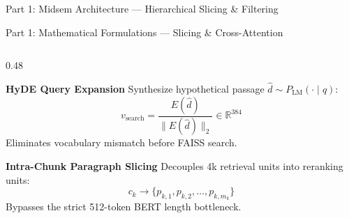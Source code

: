\documentclass[10pt,aspectratio=169]{beamer}
\begin{document}
\begin{frame}{Part 1: Midsem Architecture --- Hierarchical Slicing \& Filtering}
\end{frame}

\begin{frame}{Part 1: Mathematical Formulations --- Slicing \& Cross-Attention}
    \begin{columns}[onlytextwidth,T]
        \begin{column}{0.48\textwidth}
            \begin{block}{\textbf{HyDE Query Expansion}}
                \footnotesize
                Synthesize hypothetical passage $\hat{d} \sim P_{\text{LM}}(\cdot \mid q)$:
                \vspace{-2pt}
                \[ v_{\text{search}} = \frac{E(\hat{d})}{\|E(\hat{d})\|_2} \in \mathbb{R}^{384} \]
                \vspace{-4pt}
                Eliminates vocabulary mismatch before FAISS search.
            \end{block}

            \begin{block}{\textbf{Intra-Chunk Paragraph Slicing}}
                \footnotesize
                Decouples 4k retrieval units into reranking units:
                \vspace{-2pt}
                \[ c_k \longrightarrow \{ p_{k,1}, p_{k,2}, \dots, p_{k,m_k} \} \]
                \vspace{-4pt}
                Bypasses the strict 512-token BERT length bottleneck.
            \end{block}
        \end{column}
        

\end{columns}
\end{frame}
\end{document}
